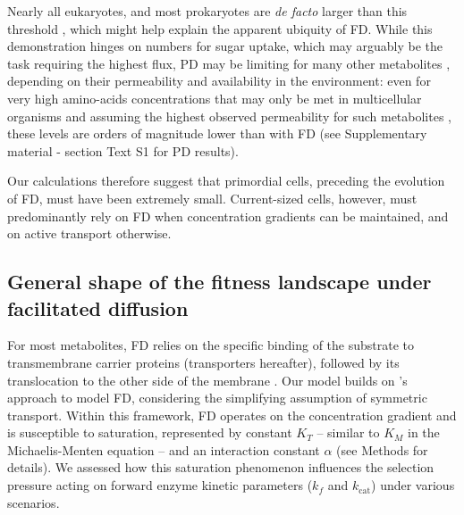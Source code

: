 \documentclass[11pt,onecolumn]{article}
\begin{document}
Nearly all eukaryotes, and most prokaryotes are \textit{de facto} larger than this threshold \citep{Heim17}, which might help explain the apparent ubiquity of FD. While this demonstration hinges on numbers for sugar uptake, which may arguably be the task requiring the highest flux, PD may be limiting for many other metabolites \citep{Boer10}, depending on their permeability and availability in the environment: even for very high amino-acids concentrations that may only be met in multicellular organisms \citep{Schmidt16} and assuming the highest observed permeability for such metabolites \citep{Chakrabarti94}, these levels are orders of magnitude lower than with FD (see Supplementary material - section Text S1 for PD results). 

Our calculations therefore suggest that primordial cells, preceding the evolution of FD, must have been extremely small. Current-sized cells, however, must predominantly rely on FD when concentration gradients can be maintained, and on active transport otherwise. 

\subsection{General shape of the fitness landscape under facilitated diffusion}

For most metabolites, FD relies on the specific binding of the substrate to transmembrane carrier proteins (transporters hereafter), followed by its translocation to the other side of the membrane \citep{danielli1954,Kotyk67,Stein86d}. Our model builds on \citet{Kuile94}'s approach to model FD, considering the simplifying assumption of symmetric transport. Within this framework, FD operates on the concentration gradient and is susceptible to saturation, represented by constant $K_T$ -- similar to $K_M$ in the Michaelis-Menten equation -- and an interaction constant $\alpha$ (see Methods for details). We assessed how this saturation phenomenon influences the selection pressure acting on forward enzyme kinetic parameters ($k_f$ and $k_\text{cat}$) under various scenarios. 
\end{document}
